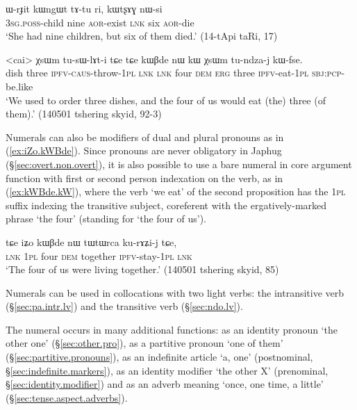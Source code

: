 \begin{exe}
\ex \label{ex:WrJit.kWngWt} 
\gll ɯ-rɟit kɯngɯt tɤ-tu ri, kɯtʂɤɣ nɯ-si \\
\textsc{3sg}.\textsc{poss}-child nine \textsc{aor}-exist \textsc{lnk} six \textsc{aor}-die \\
\glt `She had nine children, but six of them died.' (14-tApi taRi, 17)
\end{exe}

\begin{exe}
\ex \label{ex:kWBde.kW} 
\gll <cai> χsɯm tu-sɯ-lɤt-i tɕe tɕe  kɯβde nɯ kɯ χsɯm tu-ndza-j kɯ-fse. \\
dish three \textsc{ipfv}-\textsc{caus}-throw-\textsc{1pl} \textsc{lnk} \textsc{lnk} four \textsc{dem} \textsc{erg} three \textsc{ipfv}-eat-\textsc{1pl} \textsc{sbj}:\textsc{pcp}-be.like \\
\glt `We used to order three dishes, and the four of us would eat (the) three (of them).' (140501 tshering skyid, 92-3)
\end{exe}		

Numerals can also be modifiers of dual and plural pronouns as in (\ref{ex:iZo.kWBde}). Since pronouns are never obligatory in Japhug (§\ref{sec:overt.non.overt}), it is also possible to use a bare numeral in core argument function with first or second person indexation on the verb, as in (\ref{ex:kWBde.kW}), where the verb  `we eat' of the second proposition has the \textsc{1pl}  suffix indexing the transitive subject, coreferent with the ergatively-marked phrase  `the four' (standing for  `the four of us').

\begin{exe}
\ex \label{ex:iZo.kWBde} 
\gll tɕe iʑo kɯβde nɯ tɯtɯrca ku-rɤʑi-j tɕe, \\
\textsc{lnk} \textsc{1pl} four \textsc{dem}  together \textsc{ipfv}-stay-\textsc{1pl} \textsc{lnk} \\
\glt `The four of us were living together.' (140501  tshering skyid, 85)
\end{exe}		

Numerals can be used in collocations with two light verbs: the intransitive verb   (§\ref{sec:pa.intr.lv}) and the transitive verb  (§\ref{sec:ndo.lv}).
 
The numeral  occurs in many additional functions: as an identity pronoun `the other one' (§\ref{sec:other.pro}), as a partitive pronoun `one of them' (§\ref{sec:partitive.pronouns}), as an indefinite article `a, one' (postnominal, §\ref{sec:indefinite.markers}), as an identity modifier `the other X' (prenominal, §\ref{sec:identity.modifier}) and  as an adverb meaning `once, one time, a little' (§\ref{sec:tense.aspect.adverbs}).
 
